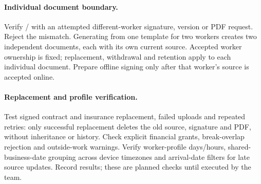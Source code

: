 \paragraph{Individual document boundary.}
Verify / with an attempted different-worker
signature, version or PDF request. Reject the mismatch. Generating from one template
for two workers creates two independent documents, each with its own current source. Accepted worker
ownership is fixed; replacement, withdrawal and retention apply to each individual
document. Prepare offline signing only after that worker's source is accepted online.


\paragraph{Replacement and profile verification.}
Test signed contract and insurance replacement, failed uploads and repeated retries:
only successful replacement deletes the old source, signature and PDF, without inheritance
or history. Check explicit financial grants, break-overlap rejection and outside-work
warnings. Verify worker-profile days/hours, shared-business-date grouping across
device timezones and arrival-date filters for late source updates. Record results;
these are planned checks until executed by the team.

